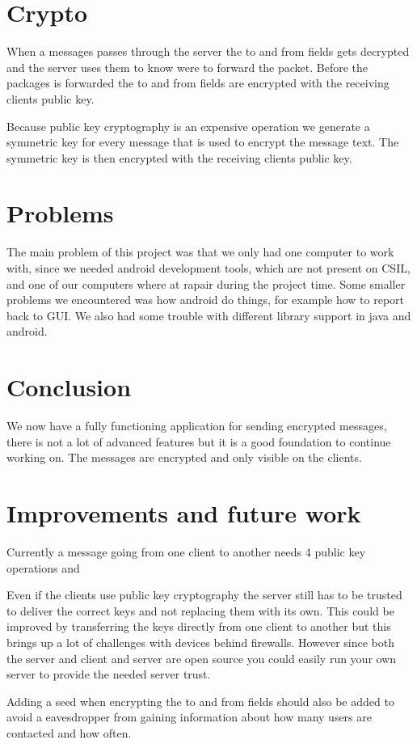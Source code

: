 \documentclass[twocolumn,11pt]{IEEEtran}
\begin{document}
 \section{Crypto}
When a messages passes through the server the to and from fields gets decrypted and the server uses them to know were to forward the packet. Before the packages is forwarded the to and from fields are encrypted with the receiving clients public key.

 Because public key cryptography is an expensive operation we generate a symmetric key for every message that is used to encrypt the message text. The symmetric key is then encrypted with the receiving clients public key. 

\section{Problems}
\label{sec:problems}
The main problem of this project was that we only had one computer to work with, since we needed android development tools, which are not present on CSIL, and one of our computers where at rapair during the project time. Some smaller problems we encountered was how android do things, for example how to report back to GUI. We also had some trouble with different library support in java and android.

\section {Conclusion}
\label{sec:conclusion}
We now have a fully functioning application for sending encrypted messages, there is not a lot of advanced features but it is a good foundation to continue working on. The messages are encrypted and only visible on the clients.

\section {Improvements and future work}
\label{sec:improve}
Currently a message going from one client to another needs 4 public key operations and 

Even if the clients use public key cryptography the server still has to be trusted to deliver the correct keys and not replacing them with its own. This could be improved by transferring the keys directly from one client to another but this brings up a lot of challenges with devices behind firewalls. However since both the server and client and server are open source you could easily run your own server to provide the needed server trust.

Adding a seed when encrypting the to and from fields should also be added to avoid a eavesdropper from gaining information about how many users are contacted and how often. 

%
%
\end{document}
